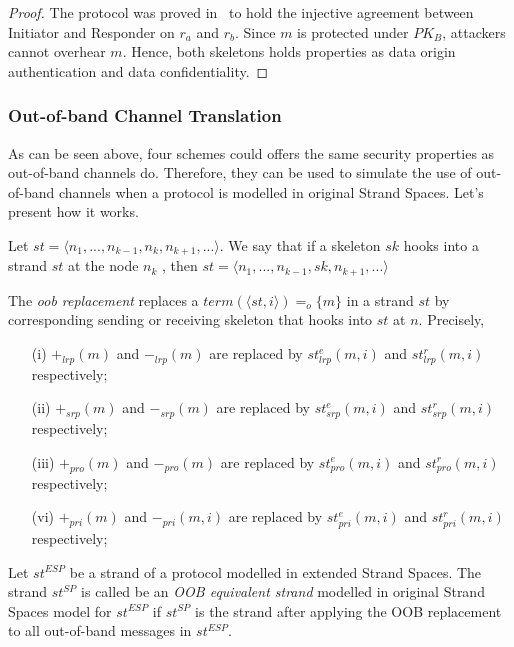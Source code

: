 \begin{proof}
The protocol was proved in~\cite{674832} to hold the injective agreement between Initiator and Responder on $r_a$ and $r_b$. Since $m$ is protected under $PK_B$, attackers cannot overhear $m$. Hence, both skeletons holds properties as data origin authentication and data confidentiality.
\end{proof}

\subsubsection*{Out-of-band Channel Translation}

As can be seen above, four schemes could offers the same security properties as out-of-band channels do. Therefore, they can be used to simulate the use of out-of-band channels when a protocol is modelled in original Strand Spaces. Let's present how it works. 

Let $st = \langle n_1,...,n_{k-1},n_k,n_{k+1},... \rangle$. We say that if a skeleton $sk$ hooks into a strand $st$ at the node $n_k$ , then $st = \langle n_1,...,n_{k-1},sk,n_{k+1},... \rangle$

\begin{Definition}\label{eos}
The \emph{oob replacement} replaces a $term(\langle st,i \rangle) = _o\{m\}$ in a strand $st$ by corresponding sending or receiving skeleton that hooks into $st$ at $n$. Precisely, 

\begin{enumerate}
\item [(i)] $+_{lrp}(m)$ and $-_{lrp}(m)$ are replaced by $st^e_{lrp}(m,i)$ and $st^r_{lrp}(m,i)$ respectively;
\item [(ii)] $+_{srp}(m)$ and $-_{srp}(m)$ are replaced by $st^e_{srp}(m,i)$ and $st^r_{srp}(m,i)$ respectively;
\item [(iii)] $+_{pro}(m)$ and $-_{pro}(m)$ are replaced by $st^e_{pro}(m,i)$ and $st^r_{pro}(m,i)$ respectively;
\item [(vi)] $+_{pri}(m)$ and $-_{pri}(m,i)$ are replaced by $st^e_{pri}(m,i)$ and $st^r_{pri}(m,i)$ respectively;\end{enumerate}
\end{Definition}

\begin{Definition} Let $st^{ESP}$ be a strand of a protocol modelled in extended Strand Spaces. The strand $st^{SP}$ is called be an \emph{OOB equivalent strand} modelled in original Strand Spaces model for $st^{ESP}$ if $st^{SP}$ is the strand after applying the OOB replacement to all out-of-band messages in $st^{ESP}$.
\end{Definition}

